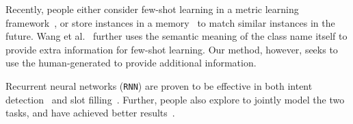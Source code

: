 Recently, people either consider few-shot learning in a metric learning framework~\cite{koch2015siamese,vinyals2016matching}, or store instances in a memory~\cite{santoro2016meta, kaiser2017learning} to match similar instances in the future.
Wang et al.~ further uses the semantic meaning of the class name itself to provide extra information for few-shot learning.
Our method, however, seeks to use the human-generated \RE to provide additional information.

Recurrent neural networks (\texttt{RNN}) are proven to be effective in both intent detection~\cite{ravuri2015comparative} and slot filling~\cite{mesnil2015using}.
Further, people also explore to jointly model the two tasks, and have achieved better results~\cite{liu2016attention, zhang2016joint}.



